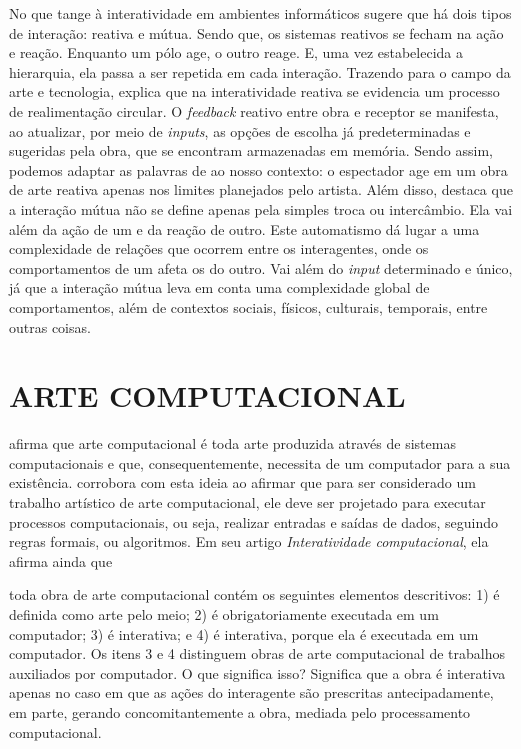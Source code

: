 No que tange à interatividade em ambientes informáticos  sugere que há dois tipos de interação: reativa e mútua. Sendo que,  os sistemas reativos se fecham na ação e reação. Enquanto um pólo age, o outro reage. E, uma vez estabelecida a hierarquia, ela passa a ser repetida em cada interação. Trazendo para o campo da arte e tecnologia,  explica que na interatividade reativa se evidencia um processo de realimentação circular. O \textit{feedback} reativo entre obra e receptor se manifesta, ao atualizar, por meio de \textit{inputs}, as opções de escolha já predeterminadas e sugeridas pela obra, que se encontram armazenadas em memória. Sendo assim, podemos adaptar as palavras de  ao nosso contexto: o espectador age em um obra de arte reativa apenas nos limites planejados pelo artista. Além disso,  destaca que a interação mútua não se define apenas pela simples troca ou intercâmbio. Ela vai além da ação de um e da reação de outro. Este automatismo dá lugar a uma complexidade de relações que ocorrem entre os interagentes, onde os comportamentos de um afeta os do outro. Vai além do \textit{input} determinado e único, já que a interação mútua leva em conta uma complexidade global de comportamentos, além de contextos sociais, físicos, culturais, temporais, entre outras coisas.


\section{ARTE COMPUTACIONAL}

 afirma que arte computacional é toda arte produzida através de sistemas  computacionais e que, consequentemente, necessita de um computador para a sua existência.  corrobora com esta ideia ao afirmar que para ser considerado um trabalho artístico de arte computacional, ele deve ser projetado para executar processos computacionais, ou seja, realizar entradas e saídas de dados, seguindo regras formais, ou algoritmos. Em seu artigo \textit{Interatividade computacional}, ela afirma ainda que

\begin{citacao}
toda obra de arte computacional contém os seguintes elementos descritivos: 1) é definida como arte pelo meio; 2) é obrigatoriamente executada em um computador; 3) é interativa; e 4) é interativa, porque ela é executada em um computador. Os itens 3 e 4 distinguem obras de arte computacional de trabalhos auxiliados por computador. O que significa isso? Significa que a obra é interativa apenas no caso em que as ações do interagente são prescritas antecipadamente, em parte, gerando concomitantemente a obra, mediada pelo processamento computacional.  \cite[p. 133]{venturelli}
\end{citacao}

